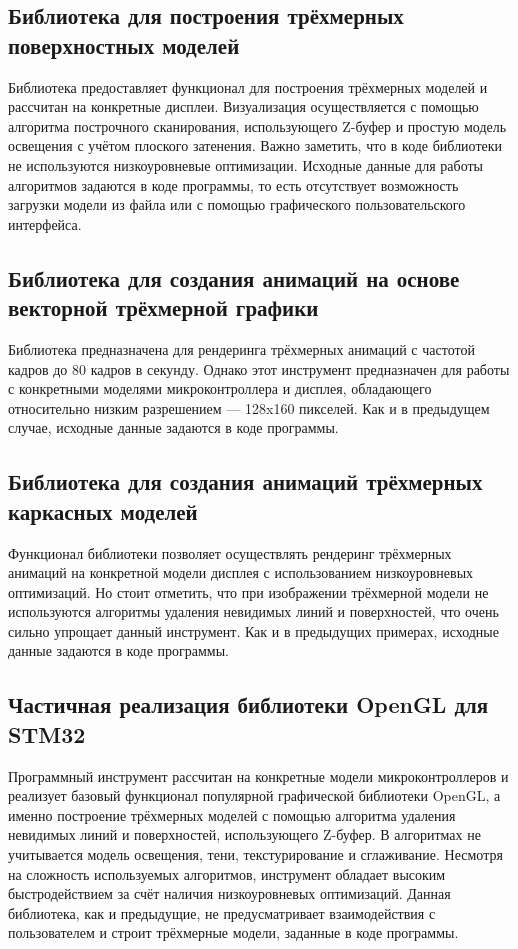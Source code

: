\subsection{Библиотека для построения трёхмерных поверхностных моделей}
Библиотека предоставляет функционал для построения трёхмерных моделей и рассчитан на конкретные дисплеи. Визуализация осуществляется с помощью алгоритма построчного сканирования, использующего Z-буфер и простую модель освещения с учётом плоского затенения. Важно заметить, что в коде библиотеки не используются низкоуровневые оптимизации. Исходные данные для работы алгоритмов задаются в коде программы, то есть отсутствует возможность загрузки модели из файла или с помощью графического пользовательского интерфейса. \cite{git1}

\subsection{Библиотека для создания анимаций на основе векторной трёхмерной графики}
Библиотека предназначена для рендеринга трёхмерных анимаций с частотой кадров до 80 кадров в секунду. Однако этот инструмент предназначен для работы с конкретными моделями микроконтроллера и дисплея, обладающего относительно низким разрешением — 128x160 пикселей. Как и в предыдущем случае, исходные данные задаются в коде программы. \cite{git2}

\subsection{Библиотека для создания анимаций трёхмерных каркасных моделей}
Функционал библиотеки позволяет осуществлять рендеринг трёхмерных анимаций на конкретной модели дисплея с использованием низкоуровневых оптимизаций. Но стоит отметить, что при изображении трёхмерной модели не используются алгоритмы удаления невидимых линий и поверхностей, что очень сильно упрощает данный инструмент. Как и в предыдущих примерах, исходные данные задаются в коде программы. \cite{git3}

\subsection{Частичная реализация библиотеки OpenGL для STM32}
Программный инструмент рассчитан на конкретные модели микроконтроллеров и реализует базовый функционал популярной графической библиотеки OpenGL, а именно построение трёхмерных моделей с помощью алгоритма удаления невидимых линий и поверхностей, использующего Z-буфер. В алгоритмах не учитывается модель освещения, тени, текстурирование и сглаживание. Несмотря на сложность используемых алгоритмов, инструмент обладает высоким быстродействием за счёт наличия низкоуровневых оптимизаций. Данная библиотека, как и предыдущие, не предусматривает взаимодействия с пользователем и строит трёхмерные модели, заданные в коде программы. \cite{git4}


